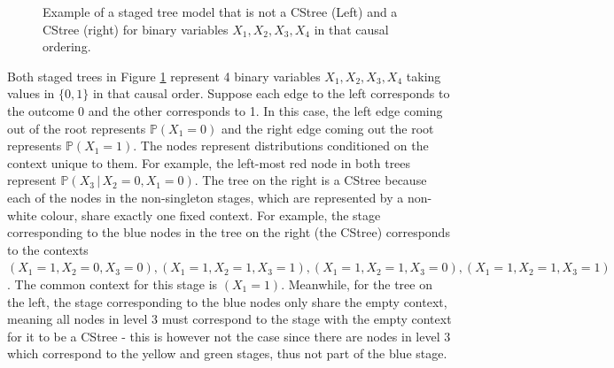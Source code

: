 \documentclass{tufte-book}
\begin{document}
\begin{figure}[!h]\label{fig:cstreestagedtree}
   \begin{floatrow}
%
\caption{Example of a staged tree model that is not a CStree (Left) and a CStree (right) for binary variables $X_1,X_2,X_3,X_4$ in that causal ordering.}
        
   \end{floatrow}
\end{figure}

Both staged trees in Figure \ref{fig:cstreestagedtree} represent 4 binary variables \(X_1,X_2,X_3,X_4\) taking values in \(\{0,1\}\) in that causal order. Suppose each edge to the left corresponds to the outcome \(0\) and the other corresponds to 1. In this case, the left edge coming out of the root represents \(\mathbb{P}(X_1 = 0)\) and the right edge coming out the root represents \(\mathbb{P}(X_1 = 1)\). The nodes represent distributions conditioned on the context unique to them. For example, the left-most red node in both trees represent \(\mathbb{P}(X_3 \,|\, X_2=0, X_1=0)\). The tree on the right is a CStree because each of the nodes in the non-singleton stages, which are represented by a non-white colour, share exactly one fixed context. For example, the stage corresponding to the blue nodes in the tree on the right (the CStree) corresponds to the contexts \((X_1=1, X_2=0, X_3=0), (X_1=1, X_2=1, X_3=1), (X_1=1, X_2=1, X_3=0), (X_1=1, X_2=1, X_3=1)\). The common context for this stage is  \((X_1=1)\). Meanwhile, for the tree on the left, the stage corresponding to the blue nodes only share the empty context, meaning all nodes in level 3 must correspond to the stage with the empty context for it to be a CStree - this is however not the case since there are nodes in level 3 which correspond to the yellow and green stages, thus not part of the blue stage. 
\end{document}
